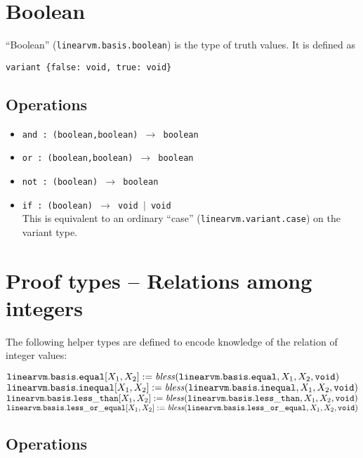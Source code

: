\documentclass[a4paper]{book}
\newcommand\tyBless{{\ensuremath{\textnormal{\textit{bless}}}}}
\begin{document}
\section{Boolean}
``Boolean'' (\texttt{linearvm.basis.boolean}) is the type of truth values.
It is defined as
\begin{center}
  \verb|variant {false: void, true: void}|
\end{center}

\subsection*{Operations}

\begin{itemize}
\item \texttt{and : (boolean,boolean) $\to$ boolean }
\item \texttt{or : (boolean,boolean) $\to$ boolean }
\item \texttt{not : (boolean) $\to$ boolean }
\item \texttt{if : (boolean) $\to$ void $|$ void }
  \\ This is equivalent to an ordinary ``case''
  (\texttt{linearvm.variant.case}) on the variant type.
\end{itemize}

\section{Proof types -- Relations among integers}

The following helper types are defined to encode knowledge of the relation of
integer values:

\medskip
\noindent
$\mathtt{linearvm.basis.equal}[X_1,X_2] := \tyBless(\mathtt{linearvm.basis.equal}, X_1,X_2, \mathtt{void})$
$\mathtt{linearvm.basis.inequal}[X_1,X_2] := \tyBless(\mathtt{linearvm.basis.inequal}, X_1,X_2, \mathtt{void})$
$\mathtt{linearvm.basis.less\_than}[X_1,X_2] := \tyBless(\mathtt{linearvm.basis.less\_than}, X_1,X_2, \mathtt{void})$
$\mathtt{linearvm.basis.less\_or\_equal}[X_1,X_2] := \tyBless(\mathtt{linearvm.basis.less\_or\_equal}, X_1,X_2, \mathtt{void})$

\subsection*{Operations}
\end{document}
